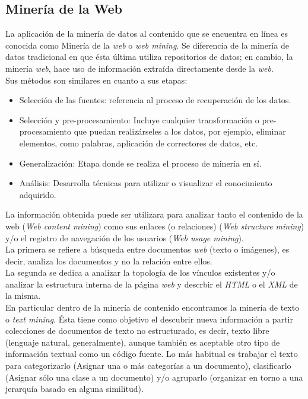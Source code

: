 	\subsection{Minería de la Web}
	\label{subsec:webMine}
	La aplicación de la minería de datos al contenido que se encuentra en línea es conocida como Minería de la \textit{web} o \textit{web mining}. Se diferencia de la minería de datos tradicional en que ésta última utiliza repositorios de datos; en cambio, la minería \textit{web}, hace uso de información extraída directamente desde la \textit{web}.\\
	Sus métodos son similares en cuanto a sus etapas:
	\begin{itemize}
	\item Selección de las fuentes: referencia al proceso de recuperación de los datos.
	\item Selección y pre-procesamiento: Incluye cualquier transformación o pre-procesamiento que puedan realizárseles a los datos, por ejemplo, eliminar elementos, como palabras, aplicación de correctores de datos, etc.
	\item Generalización: Etapa donde se realiza el proceso de minería en sí. 
	\item Análisis: Desarrolla técnicas para utilizar o visualizar el conocimiento adquirido.
	\end{itemize} 

	La información obtenida puede ser utilizara para analizar tanto el contenido de la web (\textit{Web content mining}) como sus enlaces (o relaciones) (\textit{Web  structure mining}) y/o el registro de navegación de los usuarios (\textit{Web usage mining}).\\

	La primera se refiere a búsqueda entre documentos \textit{web} (texto o imágenes), es decir, analiza los documentos y no la relación entre ellos.\\

	La segunda se dedica a analizar la topología de los vínculos existentes y/o analizar la estructura interna de la página \textit{web} y descrbir el \textit{HTML} o el \textit{XML} de la misma.\\

	En particular dentro de la minería de contenido encontramos la minería de texto o \textit{text mining}. Ésta tiene como objetivo el descubrir nueva información a partir colecciones de documentos de texto no estructurado, es decir, texto libre (lenguaje natural, generalmente), aunque también es aceptable otro tipo de información textual como un código fuente. Lo más habitual es trabajar el texto para categorizarlo (Asignar una o más categorías a un documento), clasificarlo (Asignar sólo una clase a un documento) y/o agruparlo (organizar en torno a una jerarquía basado en alguna similitud).\\

